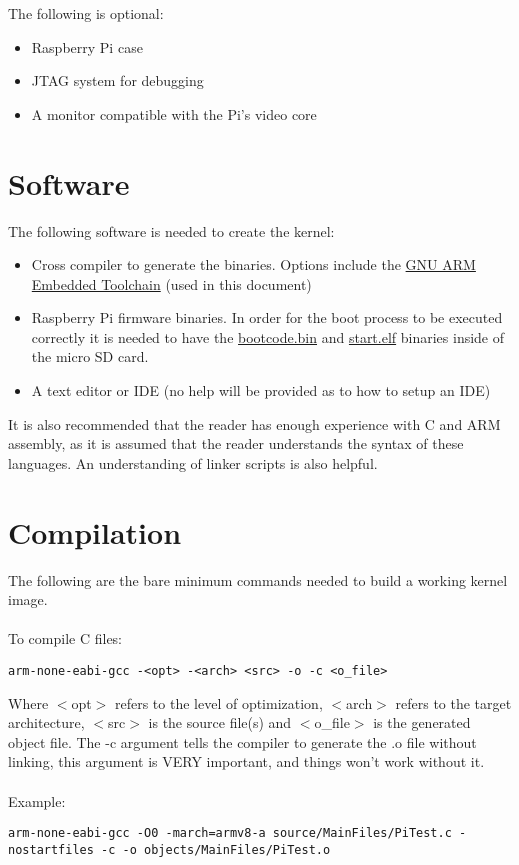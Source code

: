 \documentclass[12pt]{book}
\begin{document}
The following is optional:

\begin{itemize}
	\item Raspberry Pi case
	\item JTAG system for debugging
	\item A monitor compatible with the Pi's video core
\end{itemize}

\section{Software}
The following software is needed to create the kernel:

\begin{itemize}
	\item Cross compiler to generate the binaries. Options include the \href{https://launchpad.net/gcc-arm-embedded}{GNU ARM Embedded Toolchain} (used in this document)
	\item Raspberry Pi firmware binaries. In order for the boot process to be executed correctly it is needed to have the \href{https://github.com/raspberrypi/firmware/blob/master/boot/bootcode.bin}{bootcode.bin} and \href{https://github.com/raspberrypi/firmware/blob/master/boot/start.elf}{start.elf} binaries inside of the micro SD card.
	\item A text editor or IDE (no help will be provided as to how to setup an IDE)
\end{itemize}

It is also recommended that the reader has enough experience with C and ARM assembly, as it is assumed that the reader understands the syntax of these languages. An understanding of linker scripts is also helpful.

\section{Compilation}
\label{sec:compilation}
The following are the bare minimum commands needed to build a working kernel image. 
\\~\\
To compile C files:

\lstset{language=GCC}
\begin{lstlisting}[style = bash, xleftmargin=0\textwidth]
	arm-none-eabi-gcc -<opt> -<arch> <src> -o -c <o_file>
\end{lstlisting}

Where $<$opt$>$ refers to the level of optimization, $<$arch$>$ refers to the target architecture, $<$src$>$ is the source file(s) and $<$o\_file$>$ is the generated object file. The -c argument tells the compiler to generate the .o file without linking, this argument is VERY important, and things won't work without it.
\\~\\
Example:
\begin{lstlisting}[style = bash, xleftmargin=0\textwidth]
	arm-none-eabi-gcc -O0 -march=armv8-a source/MainFiles/PiTest.c -nostartfiles -c -o objects/MainFiles/PiTest.o
\end{lstlisting}
\end{document}
